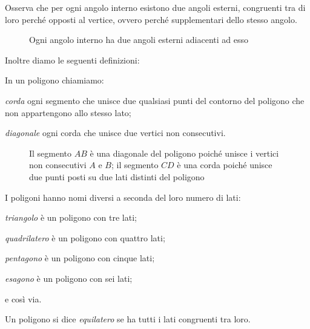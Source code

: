 Osserva che per ogni angolo interno esistono due angoli esterni, 
congruenti tra di loro perché opposti al vertice, ovvero perché 
supplementari dello stesso angolo.


\begin{inaccessibleblock}
 \begin{figure}[htb]
\centering
\caption{Ogni angolo interno ha due angoli esterni adiacenti ad esso}
\end{figure}
\end{inaccessibleblock}

Inoltre diamo le seguenti definizioni:
\begin{definizione}
In un poligono chiamiamo:
\begin{itemize*}
\item \emph{corda} ogni segmento che unisce due qualsiasi punti del 
contorno del poligono che non appartengono allo stesso lato;
\item \emph{diagonale} ogni corda che unisce due vertici non 
consecutivi.
\end{itemize*}
\end{definizione}


\begin{inaccessibleblock}
 \begin{figure}[htb]
\centering
\caption{Il segmento \(AB\) è una diagonale del poligono poiché unisce 
i vertici non consecutivi \(A\) e \(B\); il segmento \(CD\) è una corda 
poiché unisce due punti posti su due lati distinti del poligono}
\end{figure}
\end{inaccessibleblock}

I poligoni hanno nomi diversi a seconda del loro numero di lati:
\begin{itemize*}
\item \emph{triangolo} è un poligono con tre lati;
\item \emph{quadrilatero} è un poligono con quattro lati;
\item \emph{pentagono} è un poligono con cinque lati;
\item \emph{esagono} è un poligono con sei lati;
\item e così via.
\end{itemize*}

\begin{definizione}
Un poligono si dice \emph{equilatero} se ha tutti i lati congruenti 
tra loro.
\end{definizione}


